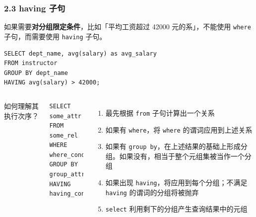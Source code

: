 \documentclass[aspectratio=169, 14pt]{beamer}
\begin{document}
\begin{frame}[fragile]
    \frametitle{2.3 having 子句}
    
    如果需要\textbf{对分组限定条件}，比如「平均工资超过 42000 元的系」，不能使用 \texttt{where} 子句，而需要使用 \texttt{having} 子句。
\pause
    \begin{verbatim}
SELECT dept_name, avg(salary) as avg_salary
FROM instructor
GROUP BY dept_name
HAVING avg(salary) > 42000;
    \end{verbatim} 

\end{frame}

\begin{frame}[fragile]

    \begin{columns}
        {\large {}} 如何理解其执行次序？
        \begin{verbatim}
SELECT some_attr
FROM some_rel
WHERE where_cond
GROUP BY group_attr
HAVING having_cond;
        \end{verbatim}         
        \begin{enumerate}
            \item 最先根据 \texttt{from} 子句计算出一个关系
            \item 如果有 \texttt{where}，将 \texttt{where} 的谓词应用到上述关系
            \item 如果有 \texttt{group by}，在上述结果的基础上形成分组。如果没有，相当于整个元组集被当作一个分组
            \item 如果出现 \texttt{having}，将应用到每个分组；不满足 \texttt{having} 的谓词的分组将被抛弃
            \item \texttt{select} 利用剩下的分组产生查询结果中的元组 
        \end{enumerate}
    \end{columns}

\end{frame}
\end{document}
